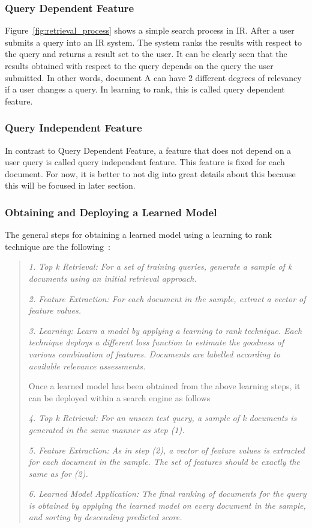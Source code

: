 \subsubsection*{Query Dependent Feature}\label{section:querydependent}
Figure~\ref{fig:retrieval_process} shows a simple search process in IR. After a user submits a query into an IR system. The system ranks the results 
with respect to the query and returns a result set to the user. It can be clearly seen that the results obtained with respect to the query depends on the 
query the user submitted. In other words, document A can have 2 different degrees of relevancy if a user changes a query.
In learning to rank, this is called query dependent feature.

\subsubsection*{Query Independent Feature}\label{section:queryindependent}
In contrast to Query Dependent Feature, a feature that does not depend on a user query is called query independent feature. This feature is fixed for each
document. For now, it is better to not dig into great details about this because this will be focused in later section.

\subsubsection*{Obtaining and Deploying a Learned Model} \label{sec:learnedmodel}
The general steps for obtaining a learned model using a learning to rank technique are the following~\cite[P. 4]{learningmodel}:

\begin{quote}
  \item \textit{1. Top k Retrieval: For a set of training queries, generate a sample of k documents using an initial retrieval approach.}
  \item \textit{2. Feature Extraction: For each document in the sample, extract a vector of feature values.}
  \item \textit{3. Learning: Learn a model by applying a learning to rank technique. Each technique deploys a different loss function to estimate the goodness of
	various combination of features. Documents are labelled according to available relevance assessments.}

Once a learned model has been obtained from the above learning steps, it can be deployed within a search engine as follows~\cite[P. 4]{learningmodel}

 \item \textit{4. Top k Retrieval: For an unseen test query, a sample of k documents is generated in the same manner as step (1).}
 \item \textit{5. Feature Extraction: As in step (2), a vector of feature values is extracted for each document in the sample. The set of features should be exactly
	the same as for (2).}
 \item \textit{6. Learned Model Application: The final ranking of documents for the query is obtained by applying the learned model on every document in the sample,
	and sorting by descending predicted score.}
\end{quote}

